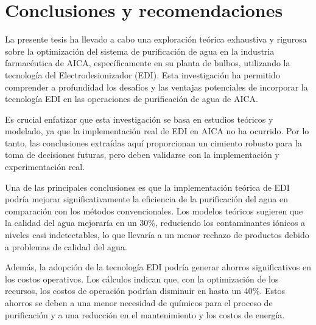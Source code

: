 \chapter*{Conclusiones y recomendaciones}


La presente tesis ha llevado a cabo una
exploración teórica exhaustiva y rigurosa sobre la
optimización del sistema de purificación de agua en la industria
farmacéutica de AICA, específicamente en su planta de bulbos,
utilizando la tecnología del Electrodesionizador (EDI).
Esta investigación ha permitido comprender a profundidad
los desafíos y las ventajas potenciales de incorporar la
tecnología EDI en las operaciones de purificación de agua de AICA.

Es crucial enfatizar que esta investigación se basa en estudios teóricos y
modelado, ya que la implementación real de EDI en AICA no ha ocurrido.
Por lo tanto, las conclusiones extraídas aquí proporcionan un cimiento
robusto para la toma de decisiones futuras, pero deben validarse con la
implementación y experimentación real.

Una de las principales conclusiones es que la implementación teórica de
EDI podría mejorar significativamente la eficiencia de la purificación
del agua en comparación con los métodos convencionales. Los modelos
teóricos sugieren que la calidad del agua mejoraría en un 30\%,
reduciendo los contaminantes iónicos a niveles casi indetectables, lo que
llevaría a un menor rechazo de productos debido a problemas de calidad del agua.

Además, la adopción de la tecnología EDI podría generar ahorros significativos
en los costos operativos. Los cálculos indican que, con la optimización de
los recursos, los costos de operación podrían disminuir en hasta un 40\%.
Estos ahorros se deben a una menor necesidad de químicos para el proceso de
purificación y a una reducción en el mantenimiento y los costos de energía.




